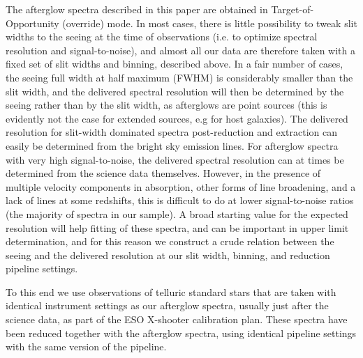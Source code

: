 \documentclass{aa}    %
\begin{document}
The afterglow spectra described in this paper are obtained in
Target-of-Opportunity (override) mode. In most cases, there is little
possibility to tweak slit widths to the seeing at the time of observations (i.e.
to optimize spectral resolution and signal-to-noise), and almost all our data are
therefore taken with a fixed set of slit widths and binning, described above. In
a fair number of cases, the seeing full width at half maximum (FWHM) is
considerably smaller than the slit width, and the delivered spectral resolution
will then be determined by the seeing rather than by the slit width, as afterglows are
point sources (this is evidently not the case for extended sources, e.g for host
galaxies). The delivered resolution for slit-width dominated spectra
post-reduction and extraction can easily be determined from the bright sky
emission lines. For afterglow spectra with very high signal-to-noise, the
delivered spectral resolution can at times be determined from the science data
themselves. However, in the presence of multiple velocity components in
absorption, other forms of line broadening, and a lack of lines at some
redshifts, this is difficult to do at lower signal-to-noise ratios (the
majority of spectra in our sample). A broad starting value for the expected
resolution will help fitting of these spectra, and can be important in upper
limit determination, and for this reason we construct a crude relation between
the seeing and the delivered resolution at our slit width, binning, and
reduction pipeline settings. 

To this end we use observations of telluric standard stars that are taken with
identical instrument settings as our afterglow spectra, usually just after the
science data, as part of the ESO X-shooter calibration plan. These spectra have
been reduced together with the afterglow spectra, using identical pipeline
settings with the same version of the pipeline. 
\end{document}
